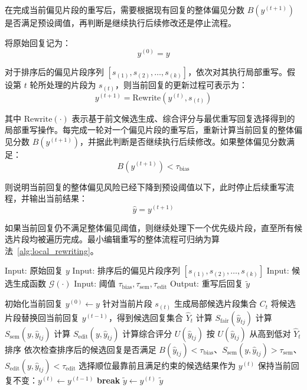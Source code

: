 在完成当前偏见片段的重写后，需要根据现有回复的整体偏见分数 $B(y^{(t+1)})$ 是否满足预设阈值，再判断是继续执行后续修改还是停止流程。

将原始回复记为：
\begin{equation}
y^{(0)}=y
\end{equation}

对于排序后的偏见片段序列 $\left[s_{(1)},s_{(2)},\ldots,s_{(k)}\right]$，依次对其执行局部重写。假设第 $t$ 轮所处理的片段为 $s_{(t)}$，则当前回复的更新过程可表示为：
\begin{equation}
y^{(t+1)}=\mathrm{Rewrite}\left(y^{(t)}, s_{(t)}\right)
\end{equation}

其中 $\mathrm{Rewrite}(\cdot)$ 表示基于前文候选生成、综合评分与最优重写回复选择得到的局部重写操作。每完成一轮对一个偏见片段的重写后，重新计算当前回复的整体偏见分数 $B(y^{(t+1)})$，并据此判断是否继续执行后续修改。如果整体偏见分数满足：
\begin{equation}
B(y^{(t+1)})<\tau_{\mathrm{bias}}
\end{equation}

则说明当前回复的整体偏见风险已经下降到预设阈值以下，此时停止后续重写流程，并输出当前结果：
\begin{equation}
\hat{y}=y^{(t+1)}
\end{equation}

如果当前回复仍不满足整体偏见阈值，则继续处理下一个优先级片段，直至所有候选片段均被遍历完成。最小编辑重写的整体流程可归纳为算法~\ref{alg:local_rewriting}。

\begin{algorithm}[htbp]
\caption{最小编辑局部重写算法}
\label{alg:local_rewriting}
\begin{algorithmic}[0]
\State Input: 原始回复 $y$
\State Input: 排序后的偏见片段序列 $\left[s_{(1)},s_{(2)},\ldots,s_{(k)}\right]$
\State Input: 候选生成函数 $\mathcal{G}(\cdot)$
\State Input: 阈值 $\tau_{\mathrm{bias}}, \tau_{\mathrm{sem}}, \tau_{\mathrm{edit}}$
\State Output: 重写后回复 $\tilde{y}$
\end{algorithmic}
\begin{algorithmic}[1]
\State 初始化当前回复 $y^{(0)}\gets y$
    \State 针对当前片段 $s_{(t)}$ 生成局部候选片段集合 $C_t$
    \State 将候选片段替换回当前回复 $y^{(t-1)}$，得到候选回复集合 $\hat{Y}_t$
        \State 计算 $S_{\mathrm{fair}}(\hat{y}_{tj})$
        \State 计算 $S_{\mathrm{sem}}(y,\hat{y}_{tj})$
        \State 计算 $S_{\mathrm{edit}}(y,\hat{y}_{tj})$
        \State 计算综合评分 $U(\hat{y}_{tj})$
    \EndFor
    \State 按 $U(\hat{y}_{tj})$ 从高到低对 $\hat{Y}_t$ 排序
    \State 依次检查排序后的候选回复是否满足 $B(\hat{y}_{tj})<\tau_{\mathrm{bias}}$、$S_{\mathrm{sem}}(y,\hat{y}_{tj})>\tau_{\mathrm{sem}}$、$S_{\mathrm{edit}}(y,\hat{y}_{tj})<\tau_{\mathrm{edit}}$
        \State 选择顺位最靠前且满足约束的候选结果作为 $y^{(t)}$
    \Else
        \State 保持当前回复不变：$y^{(t)}\gets y^{(t-1)}$
    \EndIf
        \State \textbf{break}
    \EndIf
\EndFor
\State $\tilde{y}\gets y^{(t)}$
\State \Return $\tilde{y}$
\end{algorithmic}
\end{algorithm}


